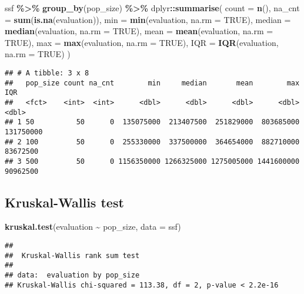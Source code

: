 \documentclass[
]{book}
\newenvironment{Shaded}{\begin{snugshade}}{\end{snugshade}}
\newcommand{\AttributeTok}[1]{\textcolor[rgb]{0.13,0.29,0.53}{#1}}
\newcommand{\ConstantTok}[1]{\textcolor[rgb]{0.56,0.35,0.01}{#1}}
\newcommand{\FunctionTok}[1]{\textcolor[rgb]{0.13,0.29,0.53}{\textbf{#1}}}
\newcommand{\NormalTok}[1]{#1}
\newcommand{\SpecialCharTok}[1]{\textcolor[rgb]{0.81,0.36,0.00}{\textbf{#1}}}
\begin{document}
\begin{Shaded}
\begin{Highlighting}[]
\NormalTok{ssf }\SpecialCharTok{\%\textgreater{}\%}
  \FunctionTok{group\_by}\NormalTok{(pop\_size) }\SpecialCharTok{\%\textgreater{}\%}
\NormalTok{  dplyr}\SpecialCharTok{::}\FunctionTok{summarise}\NormalTok{(}
    \AttributeTok{count =} \FunctionTok{n}\NormalTok{(),}
    \AttributeTok{na\_cnt =} \FunctionTok{sum}\NormalTok{(}\FunctionTok{is.na}\NormalTok{(evaluation)),}
    \AttributeTok{min =} \FunctionTok{min}\NormalTok{(evaluation, }\AttributeTok{na.rm =} \ConstantTok{TRUE}\NormalTok{),}
    \AttributeTok{median =} \FunctionTok{median}\NormalTok{(evaluation, }\AttributeTok{na.rm =} \ConstantTok{TRUE}\NormalTok{),}
    \AttributeTok{mean =} \FunctionTok{mean}\NormalTok{(evaluation, }\AttributeTok{na.rm =} \ConstantTok{TRUE}\NormalTok{),}
    \AttributeTok{max =} \FunctionTok{max}\NormalTok{(evaluation, }\AttributeTok{na.rm =} \ConstantTok{TRUE}\NormalTok{),}
    \AttributeTok{IQR =} \FunctionTok{IQR}\NormalTok{(evaluation, }\AttributeTok{na.rm =} \ConstantTok{TRUE}\NormalTok{)}
\NormalTok{  )}
\end{Highlighting}
\end{Shaded}

\begin{verbatim}
## # A tibble: 3 x 8
##   pop_size count na_cnt        min     median       mean        max       IQR
##   <fct>    <int>  <int>      <dbl>      <dbl>      <dbl>      <dbl>     <dbl>
## 1 50          50      0  135075000  213407500  251829000  803685000 131750000
## 2 100         50      0  255330000  337500000  364654000  882710000  83672500
## 3 500         50      0 1156350000 1266325000 1275005000 1441600000  90962500
\end{verbatim}

\hypertarget{kruskal-wallis-test-1}{%
\subsection{Kruskal-Wallis test}\label{kruskal-wallis-test-1}}

\begin{Shaded}
\begin{Highlighting}[]
\FunctionTok{kruskal.test}\NormalTok{(evaluation }\SpecialCharTok{\textasciitilde{}}\NormalTok{ pop\_size, }\AttributeTok{data =}\NormalTok{ ssf)}
\end{Highlighting}
\end{Shaded}

\begin{verbatim}
## 
##  Kruskal-Wallis rank sum test
## 
## data:  evaluation by pop_size
## Kruskal-Wallis chi-squared = 113.38, df = 2, p-value < 2.2e-16
\end{verbatim}
\end{document}
